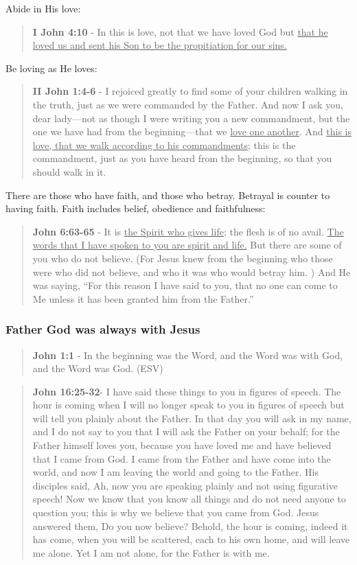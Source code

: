 \documentclass[11pt]{article}
\begin{document}
Abide in His love:

\begin{quote}
\textbf{I John 4:10} - In this is love, not that we have loved God but \uline{that he loved us and sent his Son to be the propitiation for our sins.}
\end{quote}

Be loving as He loves:

\begin{quote}
\textbf{II John 1:4-6} - I rejoiced greatly to find some of your children walking in the truth, just as we were commanded by the Father. And now I ask you, dear lady—not as though I were writing you a new commandment, but the one we have had from the beginning—that we \uline{love one another}. And \uline{this is love, that we walk according to his commandments}; this is the commandment, just as you have heard from the beginning, so that you should walk in it.
\end{quote}

There are those who have faith, and those who betray. Betrayal is counter to having faith. Faith includes belief, obedience and faithfulness:

\begin{quote}
\textbf{John 6:63-65} - It is \uline{the Spirit who gives life}; the flesh is of no avail. \uline{The words that I have spoken to you are spirit and life.} But there are some of you who do not believe. (For Jesus knew from the beginning who those were who did not believe, and who it was who would betray him. ) And He was saying, “For this reason I have said to you, that no one can come to Me unless it has been granted him from the Father.”
\end{quote}

\subsubsection{Father God was always with Jesus}
\label{sec:org0ffb943}
\begin{quote}
\textbf{John 1:1} - In the beginning was the Word, and the Word was with God, and the Word was God. (ESV)
\end{quote}

\begin{quote}
\textbf{John 16:25-32}- I have said these things to you in figures of speech. The hour is coming when I will no longer speak to you in figures of speech but will tell you plainly about the Father. In that day you will ask in my name, and I do not say to you that I will ask the Father on your behalf; for the Father himself loves you, because you have loved me and have believed that I came from God. I came from the Father and have come into the world, and now I am leaving the world and going to the Father. His disciples said, Ah, now you are speaking plainly and not using figurative speech! Now we know that you know all things and do not need anyone to question you; this is why we believe that you came from God. Jesus answered them, Do you now believe? Behold, the hour is coming, indeed it has come, when you will be scattered, each to his own home, and will leave me alone. Yet I am not alone, for the Father is with me.
\end{quote}
\end{document}
